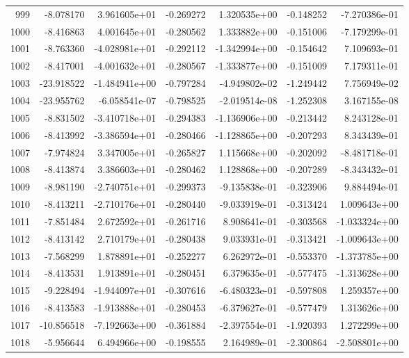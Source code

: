 \begin{tabular}{rrrrrrr}
 999 &  -8.078170 &  3.961605e+01 & -0.269272 &  1.320535e+00 &   -0.148252 & -7.270386e-01 \\
1000 &  -8.416863 &  4.001645e+01 & -0.280562 &  1.333882e+00 &   -0.151006 & -7.179299e-01 \\
1001 &  -8.763360 & -4.028981e+01 & -0.292112 & -1.342994e+00 &   -0.154642 &  7.109693e-01 \\
1002 &  -8.417001 & -4.001632e+01 & -0.280567 & -1.333877e+00 &   -0.151009 &  7.179311e-01 \\
1003 & -23.918522 & -1.484941e+00 & -0.797284 & -4.949802e-02 &   -1.249442 &  7.756949e-02 \\
1004 & -23.955762 & -6.058541e-07 & -0.798525 & -2.019514e-08 &   -1.252308 &  3.167155e-08 \\
1005 &  -8.831502 & -3.410718e+01 & -0.294383 & -1.136906e+00 &   -0.213442 &  8.243128e-01 \\
1006 &  -8.413992 & -3.386594e+01 & -0.280466 & -1.128865e+00 &   -0.207293 &  8.343439e-01 \\
1007 &  -7.974824 &  3.347005e+01 & -0.265827 &  1.115668e+00 &   -0.202092 & -8.481718e-01 \\
1008 &  -8.413874 &  3.386603e+01 & -0.280462 &  1.128868e+00 &   -0.207289 & -8.343432e-01 \\
1009 &  -8.981190 & -2.740751e+01 & -0.299373 & -9.135838e-01 &   -0.323906 &  9.884494e-01 \\
1010 &  -8.413211 & -2.710176e+01 & -0.280440 & -9.033919e-01 &   -0.313424 &  1.009643e+00 \\
1011 &  -7.851484 &  2.672592e+01 & -0.261716 &  8.908641e-01 &   -0.303568 & -1.033324e+00 \\
1012 &  -8.413142 &  2.710179e+01 & -0.280438 &  9.033931e-01 &   -0.313421 & -1.009643e+00 \\
1013 &  -7.568299 &  1.878891e+01 & -0.252277 &  6.262972e-01 &   -0.553370 & -1.373785e+00 \\
1014 &  -8.413531 &  1.913891e+01 & -0.280451 &  6.379635e-01 &   -0.577475 & -1.313628e+00 \\
1015 &  -9.228494 & -1.944097e+01 & -0.307616 & -6.480323e-01 &   -0.597808 &  1.259357e+00 \\
1016 &  -8.413583 & -1.913888e+01 & -0.280453 & -6.379627e-01 &   -0.577479 &  1.313626e+00 \\
1017 & -10.856518 & -7.192663e+00 & -0.361884 & -2.397554e-01 &   -1.920393 &  1.272299e+00 \\
1018 &  -5.956644 &  6.494966e+00 & -0.198555 &  2.164989e-01 &   -2.300864 & -2.508801e+00 \\

\end{tabular}
